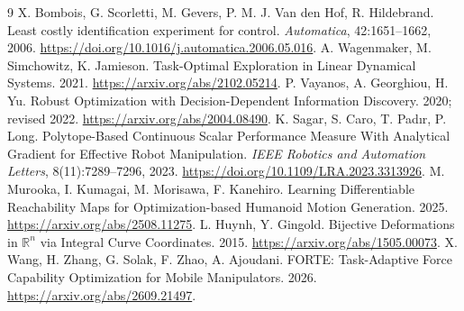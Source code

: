 \documentclass[11pt,a4paper]{article}
\numberwithin{equation}{section}
\theoremstyle{definition}
\newcommand{\R}{\mathbb R}
\begin{document}
\begingroup\small
\begin{thebibliography}{9}
X. Bombois, G. Scorletti, M. Gevers, P. M. J. Van den Hof, R. Hildebrand.
Least costly identification experiment for control.
\emph{Automatica}, 42:1651--1662, 2006.
\url{https://doi.org/10.1016/j.automatica.2006.05.016}.
A. Wagenmaker, M. Simchowitz, K. Jamieson.
Task-Optimal Exploration in Linear Dynamical Systems. 2021.
\url{https://arxiv.org/abs/2102.05214}.
P. Vayanos, A. Georghiou, H. Yu.
Robust Optimization with Decision-Dependent Information Discovery.
2020; revised 2022.
\url{https://arxiv.org/abs/2004.08490}.
K. Sagar, S. Caro, T. {Pad{\i}r}, P. Long.
Polytope-Based Continuous Scalar Performance Measure With Analytical Gradient for Effective Robot Manipulation.
\emph{IEEE Robotics and Automation Letters}, 8(11):7289--7296, 2023.
\url{https://doi.org/10.1109/LRA.2023.3313926}.
M. Murooka, I. Kumagai, M. Morisawa, F. Kanehiro.
Learning Differentiable Reachability Maps for Optimization-based Humanoid Motion Generation.
2025. \url{https://arxiv.org/abs/2508.11275}.
L. Huynh, Y. Gingold.
Bijective Deformations in $\R^n$ via Integral Curve Coordinates.
2015. \url{https://arxiv.org/abs/1505.00073}.
X. Wang, H. Zhang, G. Solak, F. Zhao, A. Ajoudani.
FORTE: Task-Adaptive Force Capability Optimization for Mobile Manipulators.
2026. \url{https://arxiv.org/abs/2609.21497}.
\end{thebibliography}
\endgroup
\end{document}
